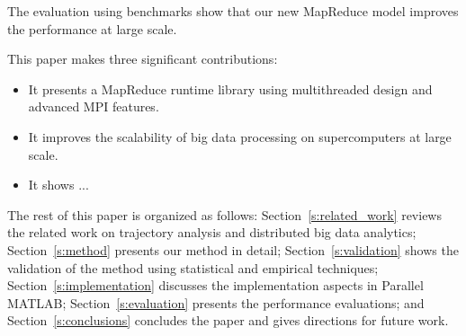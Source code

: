 The evaluation using benchmarks show that our new MapReduce
model improves the performance at large scale.

This paper makes three significant contributions:
\begin{itemize}
\item It presents a MapReduce runtime library using multithreaded 
design and advanced MPI features.
\item It improves the scalability of big data processing on supercomputers
at large scale.
\item It shows ...
\end{itemize}

The rest of this paper is organized as follows:
Section~\ref{s:related_work} reviews the related work on trajectory
analysis and distributed big data analytics; Section~\ref{s:method}
presents our method in detail; Section~\ref{s:validation} shows the
validation of the method using statistical and empirical techniques;
Section~\ref{s:implementation} discusses the implementation aspects in
Parallel MATLAB; Section~\ref{s:evaluation} presents the performance
evaluations; and Section~\ref{s:conclusions} concludes the paper and
gives directions for future work.




